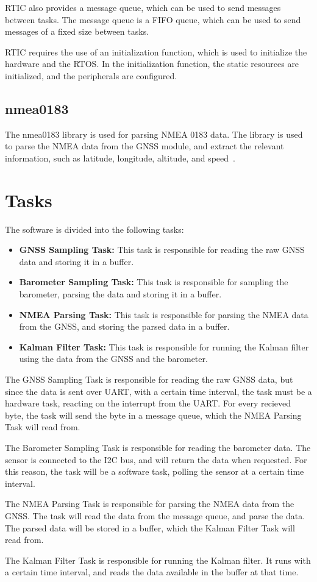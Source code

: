 RTIC also provides a message queue, which can be used to send messages between tasks.
The message queue is a FIFO queue, which can be used to send messages of a fixed size between tasks.

RTIC requires the use of an initialization function, which is used to initialize the hardware and the RTOS.
In the initialization function, the static resources are initialized, and the peripherals are configured.
\subsection{nmea0183}
The nmea0183 library is used for parsing NMEA 0183 data.
The library is used to parse the NMEA data from the GNSS module, and extract the relevant information, such as latitude, longitude, altitude, and speed~\cite{nema0183}.

\section{Tasks}
The software is divided into the following tasks:
\begin{itemize}
    \item \textbf{GNSS Sampling Task:} This task is responsible for reading the raw GNSS data and storing it in a buffer.
    \item \textbf{Barometer Sampling Task:} This task is responsible for sampling the barometer, parsing the data and storing it in a buffer.
    \item \textbf{NMEA Parsing Task:} This task is responsible for parsing the NMEA data from the GNSS, and storing the parsed data in a buffer.
    \item \textbf{Kalman Filter Task:} This task is responsible for running the Kalman filter using the data from the GNSS and the barometer.
\end{itemize}

The GNSS Sampling Task is responsible for reading the raw GNSS data, but since the data is sent over UART, with a certain time interval, the task must be a hardware task, reacting on the interrupt from the UART.
For every recieved byte, the task will send the byte in a message queue, which the NMEA Parsing Task will read from.

The Barometer Sampling Task is responsible for reading the barometer data.
The sensor is connected to the I2C bus, and will return the data when requested.
For this reason, the task will be a software task, polling the sensor at a certain time interval.

The NMEA Parsing Task is responsible for parsing the NMEA data from the GNSS.
The task will read the data from the message queue, and parse the data.
The parsed data will be stored in a buffer, which the Kalman Filter Task will read from.

The Kalman Filter Task is responsible for running the Kalman filter.
It runs with a certain time interval, and reads the data available in the buffer at that time.


%
